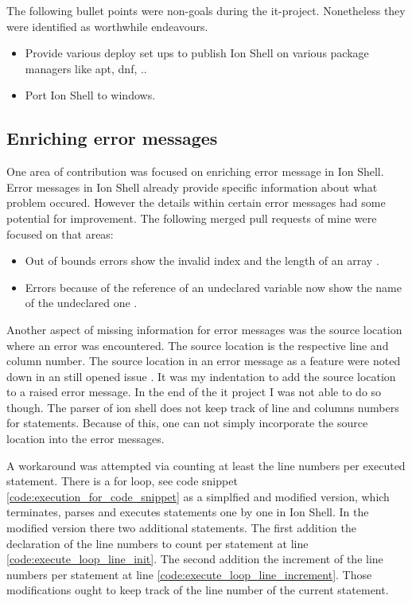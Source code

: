 The following bullet points were non-goals during the it-project. Nonetheless they were identified as worthwhile endeavours.

\begin{itemize}
	\item Provide various deploy set ups to publish Ion Shell on various package managers like apt, dnf, ..
	\item Port Ion Shell to windows.
\end{itemize}

\subsection{Enriching error messages}

One area of contribution was focused on enriching error message in Ion Shell.
Error messages in Ion Shell already provide specific information about what problem occured.
However the details within certain error messages had some potential for improvement.
The following merged pull requests of mine were focused on that areas:

\begin{itemize}
	\item Out of bounds errors show the invalid index and the length of an array \cite{pr_error_message_shows_invalid_range}.
	\item Errors because of the reference of an undeclared variable now show the name of the undeclared one \cite{pr_better_not_found_variable_show}.
\end{itemize}

Another aspect of missing information for error messages was the source location where an error was encountered.
The source location is the respective line and column number.
The source location in an error message as a feature were noted down in an still opened issue \cite{issue_enrich_error_message_information} .
It was my indentation to add the source location to a raised error message.
In the end of the it project I was not able to do so though.
The parser of ion shell does not keep track of line and columns numbers for statements.
Because of this, one can not simply incorporate the source location into the error messages.

A workaround was attempted via counting at least the line numbers per executed statement.
There is a for loop, see code snippet \ref{code:execution_for_code_snippet} as a simplfied and modified version,
which terminates, parses and executes statements one by one in Ion Shell.
In the modified version there two additional statements.
The first addition the declaration of the line numbers to count per statement at line \ref{code:execute_loop_line_init}.
The second addition the increment of the line numbers  per statement at line \ref{code:execute_loop_line_increment}.
Those modifications ought to keep track of the line number of the current statement.

